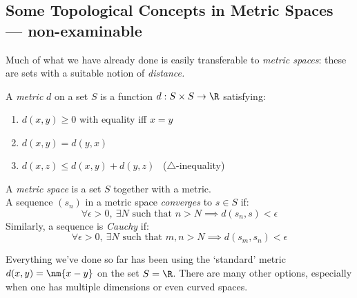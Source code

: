 \graphicspath{{notes/3series/asy/}}

\thispagestyle{empty}


\setcounter{subsection}{12}
\subsection{Some Topological Concepts in Metric Spaces --- non-examinable}

Much of what we have already done is easily transferable to \emph{metric spaces}: these are sets with a suitable notion of \emph{distance.}

\begin{defn}
A \emph{metric} $d$ on a set $S$ is a function $d:S\times S\to\R$ satisfying:
\begin{enumerate}
  \item $d(x,y)\ge 0$ with equality iff $x=y$
  \item $d(x,y)=d(y,x)$
  \item $d(x,z)\le d(x,y)+d(y,z)$ \ ($\triangle$-inequality)
\end{enumerate}
A \emph{metric space} is a set $S$ together with a metric.\\
A sequence $(s_n)$ in a metric space \emph{converges} to $s\in S$ if:
\[\forall \epsilon>0,\ \exists N \text{ such that }n>N\implies d(s_n,s)<\epsilon\]
Similarly, a sequence is \emph{Cauchy} if:
\[\forall \epsilon>0,\ \exists N \text{ such that }m,n>N\implies d(s_m,s_n)<\epsilon\]
\end{defn}

Everything we've done so far has been using the `standard' metric $d(x,y)=\nm{x-y}$ on the set $S=\R$. There are many other options, especially when one has multiple dimensions or even curved spaces. 

